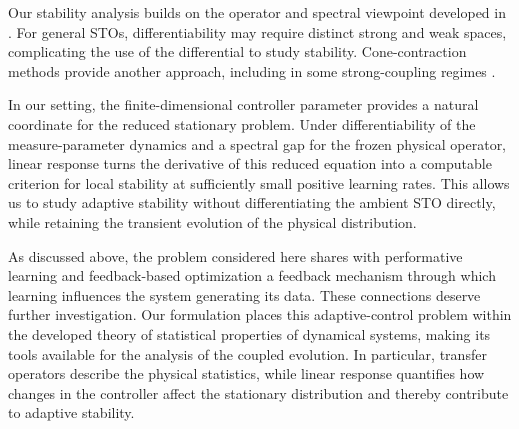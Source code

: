 \documentclass[11pt]{article}
\theoremstyle{definition}
\theoremstyle{remark}
\begin{document}
Our stability analysis builds on the operator and spectral viewpoint
developed in
\cite{GalatoloCMP,CastorriniGalatoloTanziJNS,BL}.
For general STOs, differentiability may require distinct strong and
weak spaces, complicating the use of the differential to study
stability. Cone-contraction methods provide another approach, including
in some strong-coupling regimes
\cite{CastorriniGalatoloTanziCones2026}.

In our setting, the finite-dimensional controller parameter provides
a natural coordinate for the reduced stationary problem.
Under differentiability of the measure-parameter dynamics and a
spectral gap for the frozen physical operator, linear response turns
the derivative of this reduced equation into a computable criterion
for local stability at sufficiently small positive learning rates.
This allows us to study adaptive stability without differentiating
the ambient STO directly, while retaining the transient evolution
of the physical distribution.



%

As discussed above, the problem considered here shares
with performative learning and feedback-based optimization
a feedback mechanism through which learning influences
the system generating its data.
These connections deserve further investigation.
Our formulation places this adaptive-control problem
within the developed theory of statistical properties
of dynamical systems, making its tools available for
the analysis of the coupled evolution.
In particular, transfer operators describe the physical
statistics, while linear response quantifies how changes
in the controller affect the stationary distribution
and thereby contribute to adaptive stability.
\end{document}
